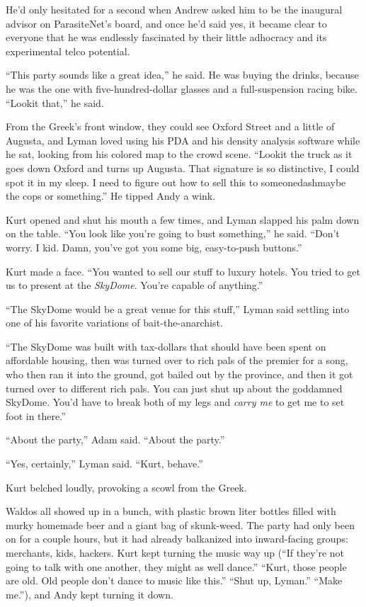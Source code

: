 He'd only hesitated for a second when Andrew asked him to be the
inaugural advisor on ParasiteNet's board, and once he'd said yes, it
became clear to everyone that he was endlessly fascinated by their
little adhocracy and its experimental telco potential.

``This party sounds like a great idea,'' he said.  He was buying the
drinks, because he was the one with five-hundred-dollar glasses and a
full-suspension racing bike.  ``Lookit that,'' he said.

From the Greek's front window, they could see Oxford Street and a
little of Augusta, and Lyman loved using his PDA and his density
analysis software while he sat, looking from his colored map to the
crowd scene.  ``Lookit the truck as it goes down Oxford and turns up
Augusta.  That signature is so distinctive, I could spot it in my
sleep.  I need to figure out how to sell this to someonedash{}maybe the
cops or something.'' He tipped Andy a wink.

Kurt opened and shut his mouth a few times, and Lyman slapped his palm
down on the table.  ``You look like you're going to bust something,''
he said.  ``Don't worry.  I kid.  Damn, you've got you some big,
easy-to-push buttons.''

Kurt made a face.  ``You wanted to sell our stuff to luxury hotels. 
You tried to get us to present at the \textit{SkyDome}.  You're
capable of anything.''

``The SkyDome would be a great venue for this stuff,'' Lyman said
settling into one of his favorite variations of bait-the-anarchist.

``The SkyDome was built with tax-dollars that should have been spent
on affordable housing, then was turned over to rich pals of the
premier for a song, who then ran it into the ground, got bailed out by
the province, and then it got turned over to different rich pals.  You
can just shut up about the goddamned SkyDome.  You'd have to break
both of my legs and \textit{carry me} to get me to set foot in
there.''

``About the party,'' Adam said.  ``About the party.''

``Yes, certainly,'' Lyman said.  ``Kurt, behave.''

Kurt belched loudly, provoking a scowl from the Greek.

 Waldos all showed up in a bunch, with plastic brown liter bottles
filled with murky homemade beer and a giant bag of skunk-weed.  The
party had only been on for a couple hours, but it had already
balkanized into inward-facing groups:  merchants, kids, hackers.  Kurt
kept turning the music way up (``If they're not going to talk with one
another, they might as well dance.'' ``Kurt, those people are old. 
Old people don't dance to music like this.'' ``Shut up, Lyman.''
``Make me.''), and Andy kept turning it down.

